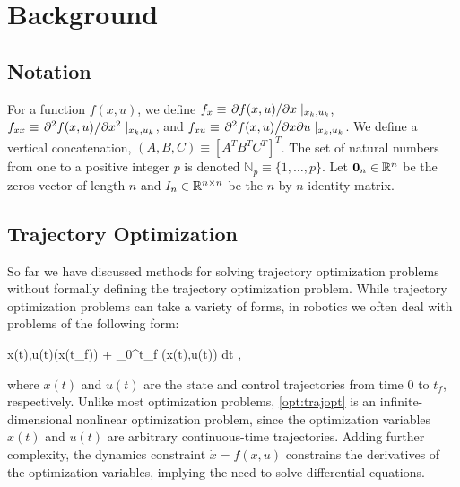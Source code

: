 \documentclass[../root.tex]{subfiles}
\begin{document}
\chapter{Background}

\section{Notation}
    For a function $f(x,u)$, we define $f_x \equiv \pdv*{f(x,u)}{x}|_{x_k,u_k}$, 
    $f_{xx} \equiv \pdv*[2]{f(x,u)}{x}|_{x_k,u_k}$, and
    $f_{xu} \equiv \pdv*{f(x,u)}{x}{u}|_{x_k,u_k}$. We 
    define a vertical concatenation, $(A,B,C) \equiv [A^T B^T C^T]^T$.
    The set of natural numbers from one to a positive integer $p$ is denoted 
    $\mathbb{N}_p \equiv \{1,\dots,p\}$. Let $\mathbf{0}_n \in \mathbb{R}^n$ be the zeros 
    vector of length $n$ and $I_n \in \mathbb{R}^{n \times n}$ be the $n$-by-$n$ 
    identity matrix.

\section{Trajectory Optimization}
So far we have discussed methods for solving trajectory optimization problems
without formally defining the trajectory optimization problem. While
trajectory optimization problems can take a variety of forms, in robotics we
often deal with problems of the following form:

\begin{mini}[2] 
	{x(t),u(t)}{\ell(x(t_f)) + \int_0^{t_f} \ell(x(t),u(t)) dt }{}{} 
\label{opt:trajopt}, \end{mini} 
where $x(t)$ and $u(t)$ are the state and control trajectories from time $0$
to $t_f$, respectively. Unlike most optimization problems,
\eqref{opt:trajopt} is an infinite-dimensional nonlinear optimization
problem, since the optimization variables $x(t)$ and $u(t)$ are arbitrary
continuous-time trajectories. Adding further complexity, the dynamics
constraint $\dot{x} = f(x,u)$ constrains the derivatives of the optimization
variables, implying the need to solve differential equations.
\end{document}
